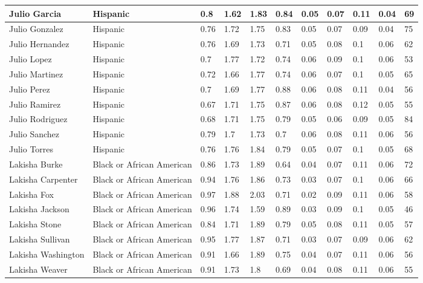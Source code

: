 \begin{table}[!ht]
\begin{tabular}{|l|l|l|l|l|l|l|l|l|l|l|}
        Julio Garcia & Hispanic & 0.8 & 1.62 & 1.83 & 0.84 & 0.05 & 0.07 & 0.11 & 0.04 & 69 \\ \hline
        Julio Gonzalez & Hispanic & 0.76 & 1.72 & 1.75 & 0.83 & 0.05 & 0.07 & 0.09 & 0.04 & 75 \\ \hline
        Julio Hernandez & Hispanic & 0.76 & 1.69 & 1.73 & 0.71 & 0.05 & 0.08 & 0.1 & 0.06 & 62 \\ \hline
        Julio Lopez & Hispanic & 0.7 & 1.77 & 1.72 & 0.74 & 0.06 & 0.09 & 0.1 & 0.06 & 53 \\ \hline
        Julio Martinez & Hispanic & 0.72 & 1.66 & 1.77 & 0.74 & 0.06 & 0.07 & 0.1 & 0.05 & 65 \\ \hline
        Julio Perez & Hispanic & 0.7 & 1.69 & 1.77 & 0.88 & 0.06 & 0.08 & 0.11 & 0.04 & 56 \\ \hline
        Julio Ramirez & Hispanic & 0.67 & 1.71 & 1.75 & 0.87 & 0.06 & 0.08 & 0.12 & 0.05 & 55 \\ \hline
        Julio Rodriguez & Hispanic & 0.68 & 1.71 & 1.75 & 0.79 & 0.05 & 0.06 & 0.09 & 0.05 & 84 \\ \hline
        Julio Sanchez & Hispanic & 0.79 & 1.7 & 1.73 & 0.7 & 0.06 & 0.08 & 0.11 & 0.06 & 56 \\ \hline
        Julio Torres & Hispanic & 0.76 & 1.76 & 1.84 & 0.79 & 0.05 & 0.07 & 0.1 & 0.05 & 68 \\ \hline
        Lakisha Burke & Black or African American & 0.86 & 1.73 & 1.89 & 0.64 & 0.04 & 0.07 & 0.11 & 0.06 & 72 \\ \hline
        Lakisha Carpenter & Black or African American & 0.94 & 1.76 & 1.86 & 0.73 & 0.03 & 0.07 & 0.1 & 0.06 & 66 \\ \hline
        Lakisha Fox & Black or African American & 0.97 & 1.88 & 2.03 & 0.71 & 0.02 & 0.09 & 0.11 & 0.06 & 58 \\ \hline
        Lakisha Jackson & Black or African American & 0.96 & 1.74 & 1.59 & 0.89 & 0.03 & 0.09 & 0.1 & 0.05 & 46 \\ \hline
        Lakisha Stone & Black or African American & 0.84 & 1.71 & 1.89 & 0.79 & 0.05 & 0.08 & 0.11 & 0.05 & 57 \\ \hline
        Lakisha Sullivan & Black or African American & 0.95 & 1.77 & 1.87 & 0.71 & 0.03 & 0.07 & 0.09 & 0.06 & 62 \\ \hline
        Lakisha Washington & Black or African American & 0.91 & 1.66 & 1.89 & 0.75 & 0.04 & 0.07 & 0.11 & 0.06 & 56 \\ \hline
        Lakisha Weaver & Black or African American & 0.91 & 1.73 & 1.8 & 0.69 & 0.04 & 0.08 & 0.11 & 0.06 & 55 \\ \hline

\end{tabular}
\end{table}
